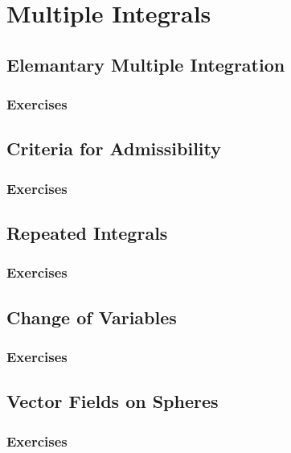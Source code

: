 \setcounter{chapter}{0}
\renewcommand{\thechapter}{20}
\chapter{Multiple Integrals}\label{ch:20}
\setcounter{equation}{0}	        %

\section{Elemantary Multiple Integration}\label{sec:20.1}
\subsection*{Exercises}\label{sec:20.1_Exercises}
\section{Criteria for Admissibility}\label{sec:20.2}	
\subsection*{Exercises}\label{sec:20.2_Exercises}
\section{Repeated Integrals}\label{sec:20.3}	
\subsection*{Exercises}\label{sec:20.3_Exercises}
\section{Change of Variables}\label{sec:20.4}	
\subsection*{Exercises}\label{sec:20.4_Exercises}
\section{Vector Fields on Spheres}\label{sec:20.5}	
\subsection*{Exercises}\label{sec:20.5_Exercises}
